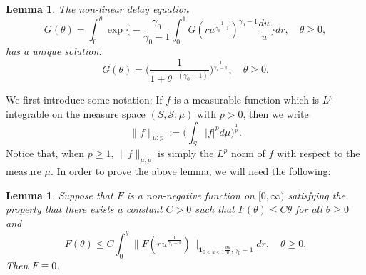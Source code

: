 \documentclass[12pt, a4paper]{amsart}
\newtheorem{lem}[thm]{Lemma}
\theoremstyle{definition}
\numberwithin{equation}{section}
\begin{document}
\begin{lem}
\label{lem: characterize the general Mittag-Leffler distribution}
	The non-linear delay equation
\[\label{eq: equation for the distribution}
	G( \theta)
	 = \int_0^\theta \exp\Big\{ - \frac{\gamma_0} {\gamma_0 - 1} \int_0^1 G(ru^{\frac{1}{\gamma_0 - 1} })^{\gamma_0 - 1}\frac{du}{u} \Big\} dr,
	\quad \theta \geq 0,
\]
	has a unique solution:
\[\label{eq: solution for the equation}
	G(\theta)
	= \Big(\frac{1}{1+\theta^{-(\gamma_0 - 1)}}\Big)^{\frac{1}{\gamma_0 - 1}},
	\quad \theta \geq 0.
\]
\end{lem}

	We first introduce some notation:
	If $f$ is a measurable function which is $L^p$ integrable on the
	measure space
	$(S,\mathscr S,\mu)$ with $p > 0$, then we write
\[
	\|f\|_{\mu;p} := \Big(\int_{S} |f|^p d\mu \Big)^{\frac{1}{p}}.
\]
	Notice that, when $p\geq 1$, $\|f\|_{\mu;p}$ is simply the $L^p$ norm of $f$ with respect to the measure $\mu$.	
	In order to prove the above lemma, we will need the following:

\begin{lem}\label{lem: F is zero}
	Suppose that $F$ is a non-negative function on $[0,\infty)$ satisfying the property that there exists a constant $C>0$ such that  $F(\theta) \leq C\theta$ for all $\theta \geq 0$ and
\[
	F(\theta)
	\leq C \int_0^\theta \|  F(ru^{ \frac{1}{\gamma_0- 1}  })\|_{\mathbf 1_{0<u<1}\frac{du}{u}; \gamma_0 - 1} dr, \quad \theta \geq 0.
\]
	Then $F \equiv 0$.
\end{lem}
	
\end{document}
